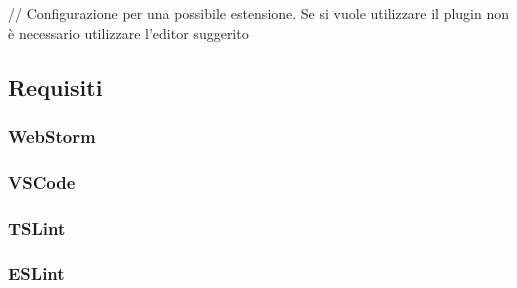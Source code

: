 // Configurazione per una possibile estensione. Se si vuole utilizzare il plugin non è necessario utilizzare l'editor suggerito
\subsection{Requisiti}
\subsubsection{WebStorm}
\subsubsection{VSCode}
\subsubsection{TSLint}
\subsubsection{ESLint}
